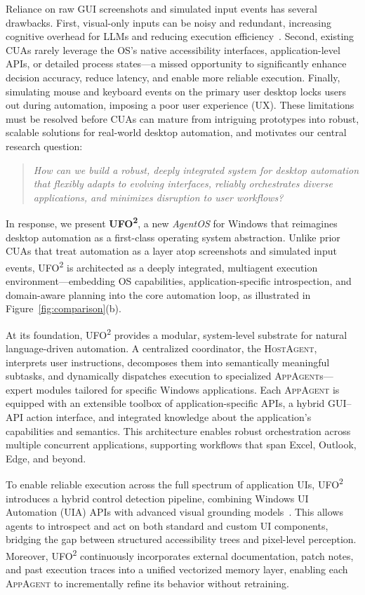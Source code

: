 \documentclass[sigplan,10pt]{acmart}
\newcommand{\name}{\textsc{UFO}\textsuperscript{2}\xspace}
\newcommand{\hosta}{\textsc{HostAgent}\xspace}
\newcommand{\appa}{\textsc{AppAgent}\xspace}
\newcommand{\appas}{\textsc{AppAgent}s\xspace}
\begin{document}
Reliance on raw GUI screenshots and simulated input events has several drawbacks. First, visual-only inputs can be noisy and redundant, increasing cognitive overhead for LLMs and reducing execution efficiency~\cite{zhang2025apiagentsvsgui}. Second, existing CUAs rarely leverage the OS's native accessibility interfaces, application-level APIs, or detailed process states---a missed opportunity to significantly enhance decision accuracy, reduce latency, and enable more reliable execution. Finally, simulating mouse and keyboard events on the primary user desktop locks users out during automation, imposing a poor user experience (UX). These limitations must be resolved before CUAs can mature from intriguing prototypes into robust, scalable solutions for real-world desktop automation, and motivates our central research question:
\begin{quote} 
    \textit{How can we build a robust, deeply integrated system for desktop automation that flexibly adapts to evolving interfaces, reliably orchestrates diverse applications, and minimizes disruption to user workflows?}
\end{quote}

In response, we present \textbf{\name}, a new \emph{AgentOS} for Windows that reimagines desktop automation as a first-class operating system abstraction. Unlike prior CUAs that treat automation as a layer atop screenshots and simulated input events, \name is architected as a deeply integrated, multiagent execution environment—embedding OS capabilities, application-specific introspection, and domain-aware planning into the core automation loop, as illustrated in Figure~\ref{fig:comparison}(b).

At its foundation, \name provides a modular, system-level substrate for natural language-driven automation. A centralized coordinator, the \hosta, interprets user instructions, decomposes them into semantically meaningful subtasks, and dynamically dispatches execution to specialized \appas—expert modules tailored for specific Windows applications. Each \appa is equipped with an extensible toolbox of application-specific APIs, a hybrid GUI–API action interface, and integrated knowledge about the application's capabilities and semantics. This architecture enables robust orchestration across multiple concurrent applications, supporting workflows that span Excel, Outlook, Edge, and beyond.

To enable reliable execution across the full spectrum of application UIs, \name introduces a hybrid control detection pipeline, combining Windows UI Automation (UIA) APIs with advanced visual grounding models~\cite{lu2024omniparser}. This allows agents to introspect and act on both standard and custom UI components, bridging the gap between structured accessibility trees and pixel-level perception. Moreover, \name continuously incorporates external documentation, patch notes, and past execution traces into a unified vectorized memory layer, enabling each \appa to incrementally refine its behavior without retraining.
\end{document}
